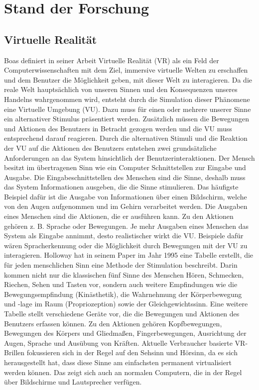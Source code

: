 \chapter{Stand der Forschung}

\section{Virtuelle Realität}
Boas definiert in  seiner Arbeit \cite{Boas2012} Virtuelle Realität (VR) als ein Feld der Computerwissenschaften mit dem Ziel, immersive virtuelle Welten zu erschaffen und dem Benutzer die Möglichkeit geben, mit dieser Welt zu interagieren. 
Da die reale Welt hauptsächlich von unseren Sinnen und den Konsequenzen unseres Handelns wahrgenommen wird, entsteht durch die Simulation dieser Phänomene eine Virtuelle Umgebung (VU). Dazu muss für einen oder mehrere unserer Sinne ein alternativer Stimulus präsentiert werden. Zusätzlich müssen die Bewegungen und Aktionen des Benutzers in Betracht gezogen werden und die VU muss entsprechend darauf reagieren.
Durch die alternativen Stimuli und die Reaktion der VU auf die Aktionen des Benutzers entstehen zwei grundsätzliche Anforderungen an das System hinsichtlich der Benutzerinteraktionen. Der Mensch besitzt im übertragenen Sinn wie ein Computer Schnittstellen zur Eingabe und Ausgabe. Die Eingabeschnittstellen des Menschen sind die Sinne, deshalb muss das System Informationen ausgeben, die die Sinne stimulieren. Das häufigste Beispiel dafür ist die Ausgabe von Informationen über einen Bildschirm, welche von den Augen aufgenommen und im Gehirn verarbeitet werden. Die Ausgaben eines Menschen sind die Aktionen, die er ausführen kann. Zu den Aktionen gehören z. B. Sprache oder Bewegungen. Je mehr Ausgaben eines Menschen das System als Eingabe annimmt, desto realistischer wirkt die VU. Beispiele dafür wären Spracherkennung oder die Möglichkeit durch Bewegungen mit der VU zu interagieren.
Holloway\cite{Holloway1995} hat in seinem Paper im Jahr 1995 eine Tabelle erstellt, die für jeden menschlichen Sinn eine Methode der Stimulation beschreibt. Darin kommen nicht nur die klassischen fünf Sinne des Menschen Hören, Schmecken, Riechen, Sehen und Tasten vor, sondern auch weitere Empfindungen wie die Bewegungsempfindung (Kinästhetik), die Wahrnehmung der Körperbewegung und -lage im Raum (Propriozeption) sowie der Gleichgewichtssinn.
Eine weitere Tabelle stellt verschiedene Geräte vor, die die Bewegungen und Aktionen des Benutzers erfassen können. Zu den Aktionen gehören Kopfbewegungen, Bewegungen des Körpers und Gliedmaßen, Fingerbewegungen, Ausrichtung der Augen, Sprache und Ausübung von Kräften.
Aktuelle Verbraucher basierte VR-Brillen fokussieren sich in der Regel auf den Sehsinn und Hörsinn, da es sich herausgestellt hat, dass diese Sinne am einfachsten permanent virtualisiert werden können. Das zeigt sich auch an normalen Computern, die in der Regel über Bildschirme und Lautsprecher verfügen.\cite{Holloway1995}

